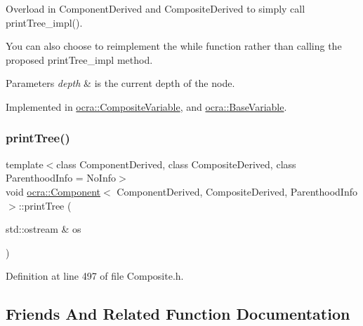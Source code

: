 Overload in Component\+Derived and Composite\+Derived to simply call print\+Tree\+\_\+impl(). 

You can also choose to reimplement the while function rather than calling the proposed print\+Tree\+\_\+impl method. 
\begin{DoxyParams}{Parameters}
{\em depth} & is the current depth of the node. \\
\hline
\end{DoxyParams}


Implemented in \hyperlink{classocra_1_1CompositeVariable_ac2015499d8f01ee39ef7bfbe33363a10}{ocra\+::\+Composite\+Variable}, and \hyperlink{classocra_1_1BaseVariable_a4058b1accad9ff7b3d8995bdf9285fbd}{ocra\+::\+Base\+Variable}.

\hypertarget{classocra_1_1Component_a9bc74f9a471df60ee9b1d49e7f55e04f}{}\label{classocra_1_1Component_a9bc74f9a471df60ee9b1d49e7f55e04f} 
\subsubsection{\texorpdfstring{print\+Tree()}{printTree()}}
{\footnotesize\ttfamily template$<$class Component\+Derived, class Composite\+Derived, class Parenthood\+Info = No\+Info$>$ \\
void \hyperlink{classocra_1_1Component}{ocra\+::\+Component}$<$ Component\+Derived, Composite\+Derived, Parenthood\+Info $>$\+::print\+Tree (\begin{DoxyParamCaption}\item[{std\+::ostream \&}]{os }\end{DoxyParamCaption})\hspace{0.3cm}{\ttfamily [inline]}}



Definition at line 497 of file Composite.\+h.



\subsection{Friends And Related Function Documentation}
\hypertarget{classocra_1_1Component_ad71e675afae5fce6263d2d784cd3907a}{}\label{classocra_1_1Component_ad71e675afae5fce6263d2d784cd3907a} 
